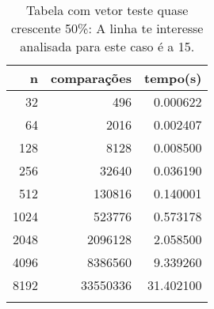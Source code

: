 \begin{table}[ht]
\centering
\begin{tabular}{rrr} \toprule
        n &    comparações &       tempo(s) \\ \midrule
      32  &            496 &      0.000622 \\
      64  &           2016 &      0.002407 \\
     128  &           8128 &      0.008500 \\
     256  &          32640 &      0.036190 \\
     512  &         130816 &      0.140001 \\
    1024  &         523776 &      0.573178 \\
    2048  &        2096128 &      2.058500 \\
    4096  &        8386560 &      9.339260 \\
    8192  &       33550336 &     31.402100 \\
\bottomrule\addlinespace
\end{tabular}
\caption{Tabela com vetor teste quase crescente 50\%: A linha te interesse analisada para este caso é a 15.}
\label{tab:selectionsortQuaseCresc50}
\end{table}

